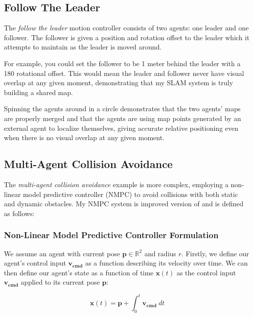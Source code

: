 \subsection{Follow The Leader}
\label{sec:follow-the-leader}
The \textit{follow the leader} motion controller consists of two agents: one leader and one follower. The follower is given a position and rotation offset to the leader which it attempts to maintain as the leader is moved around.

For example, you could set the follower to be 1 meter behind the leader with a 180\textdegree{} rotational offset. This would mean the leader and follower never have visual overlap at any given moment, demonstrating that my SLAM system is truly building a shared map.

Spinning the agents around in a circle demonstrates that the two agents' maps are properly merged and that the agents are using map points generated by an external agent to localize themselves, giving accurate relative positioning even when there is no visual overlap at any given moment.


\subsection{Multi-Agent Collision Avoidance}
\label{sec:multi-agent-collision-avoidance-implementation}
The \textit{multi-agent collision avoidance} example is more complex, employing a non-linear model predictive controller (NMPC) to avoid collisions with both static and dynamic obstacles. My NMPC system is improved version of \autocite{DBLP:journals/corr/KamelASN17} and is defined as follows:

\subsubsection{Non-Linear Model Predictive Controller Formulation}
\label{sec:nmpc-controller-formulation}
We assume an agent with current pose $\bm{p} \in \mathbb{R}^2$ and radius $r$. Firstly, we define our agent's control input $\bm{v_{cmd}}$ as a function describing its velocity over time. We can then define our agent's state as a function of time $\bm{x}(t)$ as the control input $\bm{v_{cmd}}$ applied to its current pose $\bm{p}$:

\begin{equation}
    \bm{x}(t) = \bm{p} + \int_{0}^{t} \bm{v_{cmd}}\ dt
\end{equation}

